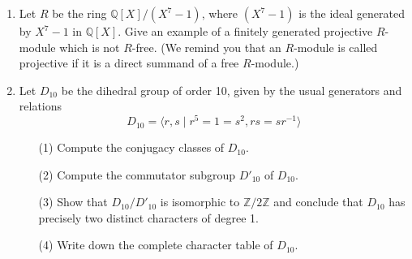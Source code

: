 \documentclass{article}
\begin{document}
\begin{enumerate}
    \item Let \(R\) be the ring \(\mathbb{Q}[X]/(X^7-1)\), where \((X^7-1)\) is the ideal generated by \(X^7-1\) in \(\mathbb{Q}[X]\). Give an example of a finitely generated projective \(R\)-module which is not \(R\)-free. (We remind you that an \(R\)-module is called projective if it is a direct summand of a free \(R\)-module.)

    \item Let \(D_{10}\) be the dihedral group of order 10, given by the usual generators and relations
    \[D_{10} = \langle r, s \mid r^5=1=s^2, rs=sr^{-1} \rangle\]
    \begin{itemize}
        \item[(1)] Compute the conjugacy classes of \(D_{10}\).
        \item[(2)] Compute the commutator subgroup \(D'_{10}\) of \(D_{10}\).
        \item[(3)] Show that \(D_{10}/D'_{10}\) is isomorphic to \(\mathbb{Z}/2\mathbb{Z}\) and conclude that \(D_{10}\) has precisely two distinct characters of degree 1.
        \item[(4)] Write down the complete character table of \(D_{10}\).
    \end{itemize}
\end{enumerate}
\end{document}
